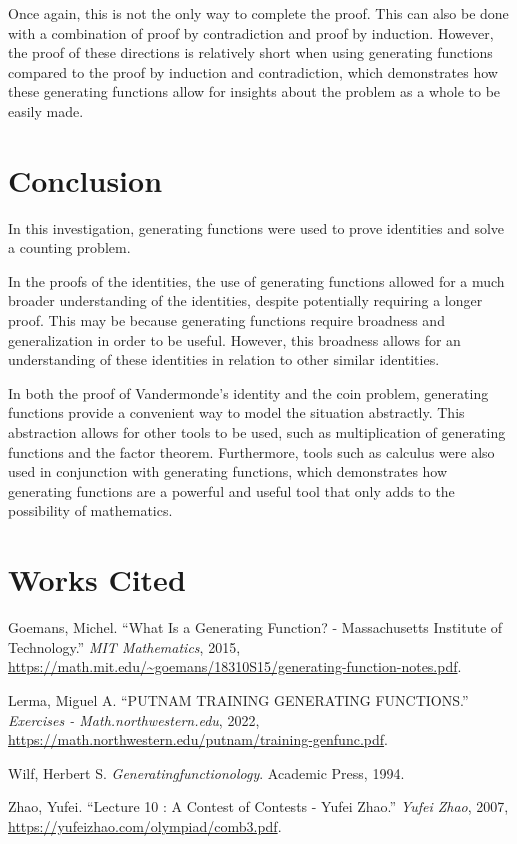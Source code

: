 \documentclass[12pt]{article}
\begin{document}
Once again, this is not the only way to complete the proof. This can also be done with a combination of proof by contradiction and proof by induction. However, the proof of these directions is relatively short when using generating functions compared to the proof by induction and contradiction, which demonstrates how these generating functions allow for insights about the problem as a whole to be easily made.
\section{Conclusion}
In this investigation, generating functions were used to prove identities and solve a counting problem.

In the proofs of the identities, the use of generating functions allowed for a much broader understanding of the identities, despite potentially requiring a longer proof. This may be because generating functions require broadness and generalization in order to be useful. However, this broadness allows for an understanding of these identities in relation to other similar identities.

In both the proof of Vandermonde's identity and the coin problem, generating functions provide a convenient way to model the situation abstractly. This abstraction allows for other tools to be used, such as multiplication of generating functions and the factor theorem. Furthermore, tools such as calculus were also used in conjunction with generating functions, which demonstrates how generating functions are a powerful and useful tool that only adds to the possibility of mathematics.

\section{Works Cited}
\begin{sloppypar}
Goemans, Michel. “What Is a Generating Function? - Massachusetts Institute of Technology.” \textit{MIT Mathematics}, 2015, \url{https://math.mit.edu/~goemans/18310S15/generating-function-notes.pdf}. 

Lerma, Miguel A. “PUTNAM TRAINING GENERATING FUNCTIONS.” \textit{Exercises - Math.northwestern.edu}, 2022, \url{https://math.northwestern.edu/putnam/training-genfunc.pdf}. 

Wilf, Herbert S. \textit{Generatingfunctionology}. Academic Press, 1994.

Zhao, Yufei. “Lecture 10 : A Contest of Contests - Yufei Zhao.” \textit{Yufei Zhao}, 2007, \url{https://yufeizhao.com/olympiad/comb3.pdf}. 


\end{sloppypar}
\end{document}
